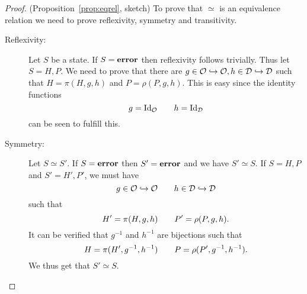 \begin{proof}{(Proposition~\ref{prop:eqrel}, sketch)} 
  To prove that $\simeq$ is an equivalence relation we need to prove
  reflexivity, symmetry and transitivity.
  \begin{description}
    \item[Reflexivity:] Let $S$ be a state. If $S = \mbox{{\bf error}}$ then reflexivity
      follows trivially. Thus let $S = H, P$. We need to prove that there are $g
      \in \mathcal{O} \hookrightarrow \mathcal{O}, h \in \mathcal{D} \hookrightarrow \mathcal{D}$ such
      that $H = \pi(H, g, h)$ and $P = \rho(P, g, h)$. This is easy since the
      identity functions
      \begin{equation*}
        g = \mathrm{Id}_{\mathcal{O}} \quad\quad h = \mathrm{Id}_{\mathcal{D}}
      \end{equation*}
      can be seen to fulfill this.

    \item[Symmetry:] Let $S \simeq S'$. If $S = \mbox{{\bf error}}$ then $S' = \mbox{{\bf error}}$ and
      we have $S' \simeq S$. If $S = H, P$ and $S' = H', P'$, we must have
      \begin{equation*}
        g \in \mathcal{O} \hookrightarrow \mathcal{O} \quad\quad h \in \mathcal{D}
        \hookrightarrow \mathcal{D}
      \end{equation*}
      such that
      \begin{equation*}
        H' = \pi(H, g, h) \quad\quad P' = \rho(P, g, h).
      \end{equation*}
      It can be verified that $g^{-1}$ and $h^{-1}$ are bijections such that
      \begin{equation*}
        H = \pi(H', g^{-1}, h^{-1}) \quad\quad P = \rho(P', g^{-1}, h^{-1}).
      \end{equation*}
      We thus get that $S' \simeq S$.


\end{description}
\end{proof}
